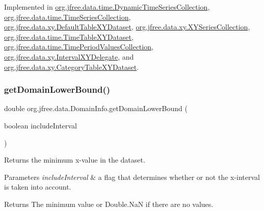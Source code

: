 Implemented in \mbox{\hyperlink{classorg_1_1jfree_1_1data_1_1time_1_1_dynamic_time_series_collection_ad6caf2b6e69b6d580a3c301dd786ca9e}{org.\+jfree.\+data.\+time.\+Dynamic\+Time\+Series\+Collection}}, \mbox{\hyperlink{classorg_1_1jfree_1_1data_1_1time_1_1_time_series_collection_a3d78b109c0a1f7a9795f8c5108613084}{org.\+jfree.\+data.\+time.\+Time\+Series\+Collection}}, \mbox{\hyperlink{classorg_1_1jfree_1_1data_1_1xy_1_1_default_table_x_y_dataset_a06adf5ac38cf7beb118b2cbb64a9e10d}{org.\+jfree.\+data.\+xy.\+Default\+Table\+X\+Y\+Dataset}}, \mbox{\hyperlink{classorg_1_1jfree_1_1data_1_1xy_1_1_x_y_series_collection_a21ae9645c6f9ed82cdd4f358da48d62b}{org.\+jfree.\+data.\+xy.\+X\+Y\+Series\+Collection}}, \mbox{\hyperlink{classorg_1_1jfree_1_1data_1_1time_1_1_time_table_x_y_dataset_ac8ffe14dbf4e3a9934c19222d97acbfe}{org.\+jfree.\+data.\+time.\+Time\+Table\+X\+Y\+Dataset}}, \mbox{\hyperlink{classorg_1_1jfree_1_1data_1_1time_1_1_time_period_values_collection_a724b7598d02651f029fe910753fbbe86}{org.\+jfree.\+data.\+time.\+Time\+Period\+Values\+Collection}}, \mbox{\hyperlink{classorg_1_1jfree_1_1data_1_1xy_1_1_interval_x_y_delegate_a4b2d8f90fd92fc9108f9556c02b0febd}{org.\+jfree.\+data.\+xy.\+Interval\+X\+Y\+Delegate}}, and \mbox{\hyperlink{classorg_1_1jfree_1_1data_1_1xy_1_1_category_table_x_y_dataset_a11cf2d528ab14a6d2affc68ff258d9e4}{org.\+jfree.\+data.\+xy.\+Category\+Table\+X\+Y\+Dataset}}.

\mbox{\label{interfaceorg_1_1jfree_1_1data_1_1_domain_info_ae1b4d9d415fe0a79bd2ce0f6e0a3f489}} 
\subsubsection{\texorpdfstring{get\+Domain\+Lower\+Bound()}{getDomainLowerBound()}}
{\footnotesize\ttfamily double org.\+jfree.\+data.\+Domain\+Info.\+get\+Domain\+Lower\+Bound (\begin{DoxyParamCaption}\item[{boolean}]{include\+Interval }\end{DoxyParamCaption})}

Returns the minimum x-\/value in the dataset.


\begin{DoxyParams}{Parameters}
{\em include\+Interval} & a flag that determines whether or not the x-\/interval is taken into account.\\
\hline
\end{DoxyParams}
\begin{DoxyReturn}{Returns}
The minimum value or {\ttfamily Double.\+NaN} if there are no values. 
\end{DoxyReturn}


